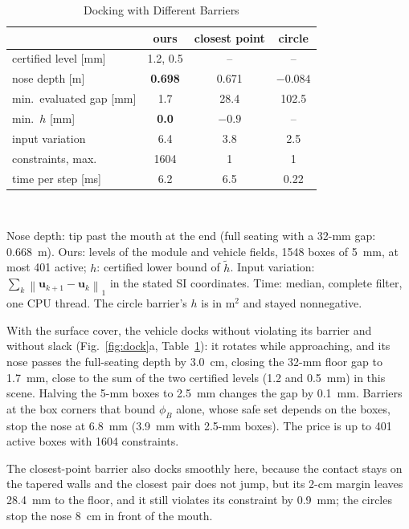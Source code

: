 \documentclass[journal]{IEEEtran}
\theoremstyle{definition}
\newcommand{\norm}[1]{\left\lVert #1\right\rVert}
\begin{document}
\begin{table}[t]
\caption{Docking with Different Barriers}
\label{tab:dock-base}
\centering
\footnotesize
\setlength{\tabcolsep}{4pt}
\renewcommand{\arraystretch}{1.05}
\begin{tabular}{lccc}
\toprule
& ours & closest point & circle\\
\midrule
certified level [mm] & 1.2, 0.5 & -- & --\\
nose depth [m] & \textbf{0.698} & 0.671 & $-0.084$\\
min.\ evaluated gap [mm] & 1.7 & 28.4 & 102.5\\
min.\ $h$ [mm] & \textbf{0.0} & $-0.9$ & --\\
input variation & 6.4 & 3.8 & 2.5\\
constraints, max. & 1604 & 1 & 1\\
time per step [ms] & 6.2 & 6.5 & 0.22\\
\bottomrule
\end{tabular}
\\[3pt]
\parbox{\columnwidth}{\footnotesize Nose depth: tip past the mouth at the end (full seating with a
32-mm gap: 0.668~m). Ours: levels of the module and vehicle fields, 1548 boxes of 5~mm, at most 401
active; $h$: certified lower bound of $\tilde h$. Input variation:
$\sum_k\norm{\mathbf u_{k+1}-\mathbf u_k}_1$ in the stated SI coordinates.
Time: median, complete filter, one CPU thread. The
circle barrier's $h$ is in m$^2$ and stayed nonnegative.}
\end{table}

With the surface cover, the vehicle docks without violating its barrier and without slack
(Fig.~\ref{fig:dock}a, Table~\ref{tab:dock-base}): it rotates while approaching, and its nose passes
the full-seating depth by 3.0~cm, closing the 32-mm floor gap to 1.7~mm, close to the sum of the
two certified levels (1.2 and 0.5~mm) in this scene. Halving the 5-mm boxes to 2.5~mm changes
the gap by 0.1~mm. Barriers at the box corners that bound $\phi_B$ alone, whose safe set
depends on the boxes, stop the nose at 6.8~mm (3.9~mm with 2.5-mm boxes). The price is up to 401 active boxes with 1604 constraints.

The closest-point barrier also docks smoothly here, because the contact stays on the tapered walls and
the closest pair does not jump, but its 2-cm margin leaves 28.4~mm to the floor, and it still
violates its constraint by 0.9~mm; the circles stop the nose 8~cm in front of the mouth.
\end{document}
